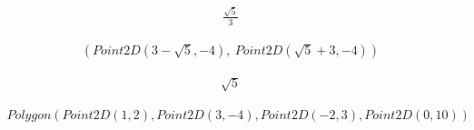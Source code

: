 \documentclass[letterpaper,10pt,english]{jupyterBook}
\begin{document}
\begin{sphinxVerbatim}[commandchars=\\\{\}]
\end{sphinxVerbatim}
\begin{equation*}
\begin{split}\displaystyle \frac{\sqrt{5}}{3}\end{split}
\end{equation*}
\begin{sphinxVerbatim}[commandchars=\\\{\}]
 
\end{sphinxVerbatim}
\begin{equation*}
\begin{split}\displaystyle \left( Point2D\left(3 - \sqrt{5}, -4\right), \  Point2D\left(\sqrt{5} + 3, -4\right)\right)\end{split}
\end{equation*}
\begin{sphinxVerbatim}[commandchars=\\\{\}]
 
\end{sphinxVerbatim}
\begin{equation*}
\begin{split}\displaystyle \sqrt{5}\end{split}
\end{equation*}
\begin{sphinxVerbatim}[commandchars=\\\{\}]
  
   
\end{sphinxVerbatim}
\begin{equation*}
\begin{split}\displaystyle Polygon\left(Point2D\left(1, 2\right), Point2D\left(3, -4\right), Point2D\left(-2, 3\right), Point2D\left(0, 10\right)\right)\end{split}
\end{equation*}
\begin{sphinxVerbatim}[commandchars=\\\{\}]
\end{sphinxVerbatim}
\end{document}
